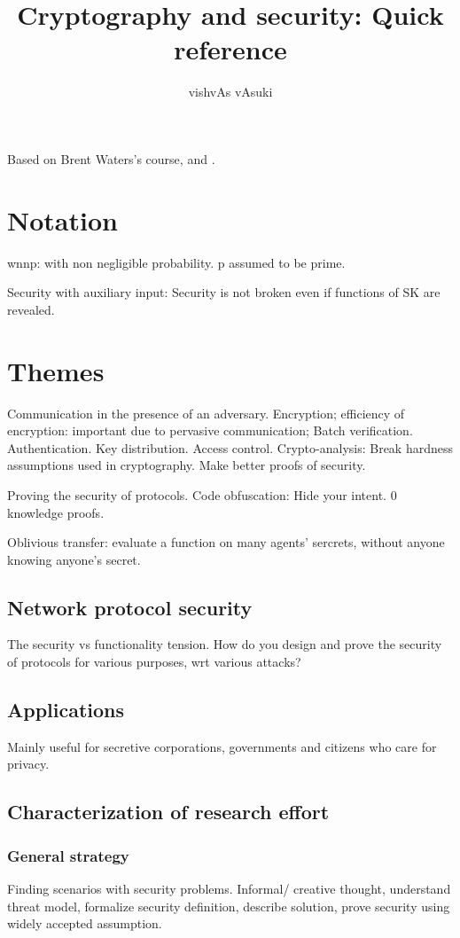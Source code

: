 \documentclass[oneside, article]{memoir}
\title{Cryptography and security: Quick reference}
\author{vishvAs vAsuki}
\begin{document}
\maketitle

Based on Brent Waters's course, \cite{bellareGoldwasser} and \cite{kearnsVazirani}.

\chapter{Notation}
wnnp: with non negligible probability. p assumed to be prime.

Security with auxiliary input: Security is not broken even if functions of SK are revealed.

\chapter{Themes}
Communication in the presence of an adversary. Encryption; efficiency of encryption: important due to pervasive communication; Batch verification. Authentication. Key distribution. Access control. Crypto-analysis: Break hardness assumptions used in cryptography. Make better proofs of security.

Proving the security of protocols. Code obfuscation: Hide your intent. 0 knowledge proofs.

Oblivious transfer: evaluate a function on many agents' sercrets, without anyone knowing anyone's secret.

\section{Network protocol security}
The security vs functionality tension. How do you design and prove the security of protocols for various purposes, wrt various attacks?

\section{Applications}
Mainly useful for secretive corporations, governments and citizens who care for privacy.

\section{Characterization of research effort}
\subsection{General strategy}
Finding scenarios with security problems. Informal/ creative thought, understand threat model, formalize security definition, describe solution, prove security using widely accepted assumption.
\end{document}
